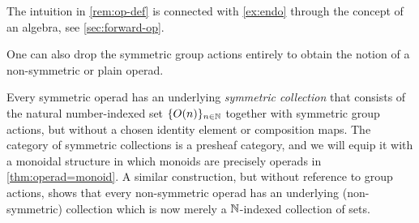 
\begin{rem}
The intuition in \cref{rem:op-def} is connected with \cref{ex:endo} through the concept of an algebra, see \cref{sec:forward-op}.
\end{rem}

One can also drop the symmetric group actions entirely to obtain the notion of a non-symmetric or plain operad.


\begin{rem}\label{rem:V-and-coll}
 Every symmetric operad has an underlying \textit{symmetric collection} that consists of the natural number-indexed set $\{ O(n) \}_{n \in \mathbb{N}}$ together with symmetric group actions, but without a chosen identity element or composition maps. The category of symmetric collections is a presheaf category, and we will equip it with a monoidal structure in which monoids are precisely operads in \cref{thm:operad=monoid}. A similar construction, but without reference to group actions, shows that every non-symmetric operad has an underlying (non-symmetric) collection which is now merely a $\mathbb{N}$-indexed collection of sets.
\end{rem}

